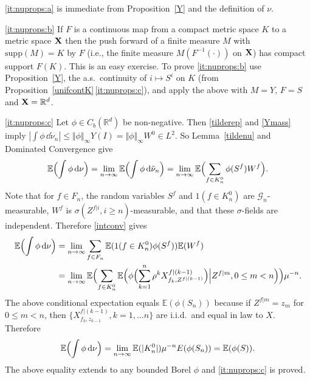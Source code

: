 \documentclass[12pt]{article}
\makeatletter
\renewenvironment{proof}[1][\proofname]{%
\par\pushQED{\qed}\normalfont%
\topsep6\p@\@plus6\p@\relax
\trivlist\item[\hskip\labelsep\bfseries#1\@addpunct{.}]%
\ignorespaces
}{%
\popQED\endtrivlist\@endpefalse
}
\numberwithin{theorem}{section}
\theoremstyle{def}
\numberwithin{equation}{section}
\newcommand{\E}{\mathbb{E}}
\newcommand{\R}{\mathbb{R}}
\newcommand{\cG}{\mathcal G}
\newcommand{\supp}{\mathrm{supp}}
\makeatother
\begin{document}
\begin{proof}
\ref{it:nuprops:a} is immediate from Proposition~\ref{Y} and the definition of $\nu$.

\ref{it:nuprops:b} If $F$ is a continuous map from a compact metric space $K$ to a metric space ${\bf X}$ then the push forward of a finite measure $M$ with $\supp(M)=K$ by $F$ (i.e., the finite measure $M(F^{-1}(\cdot))$ on ${\bf X}$) has compact support $F(K)$.  
This is an easy exercise.  To prove \ref{it:nuprops:b} use Proposition~\ref{Y}, the a.s.\ continuity of $i\mapsto S^i$ on $K$ (from Proposition~\ref{unifcontK}\,\ref{it:nuprops:c}), and apply the above with $M=Y$, $F=S$ and ${\bf X}=\R^d$.  

\ref{it:nuprops:c} Let $\phi\in C_b(\R^d)$ be non-negative.  
Then \eqref{tilderep} and \eqref{Ymass} imply 
$|\int\phi \, \dd \tilde \nu_n|\le \Vert\phi\Vert_\infty Y(I)= \Vert\phi\Vert_\infty W^0\in L^2$. 
So Lemma~\ref{tildenu} and Dominated Convergence give 
\begin{equation}\label{intconv}
\E\Bigl(\int\phi\,\dd \nu\Bigr)=\lim_{n\to\infty} \E\Bigl(\int\phi\,\dd \tilde  \nu_n\Bigr)=\lim_{n\to\infty} \E\Bigl(\sum_{f\in K^0_n}\phi(S^f)W^f\Bigr).
\end{equation}
Note that for $f\in F_n$, the random variables $S^f$ and $1(f\in K^0_n)$ are $\cG_n$-measurable, $W^f$ is $\sigma(Z^{f|i},i\ge n)$-measurable, and that these $\sigma$-fields are independent. Therefore
\eqref{intconv} gives
\begin{align*}
\E\Bigl(\int\phi\,\dd \nu\Bigr)&=\lim_{n\to\infty}\sum_{f\in F_n}\E(1(f\in K^0_n)\phi(S^f))\E(W^f)\\
&=\lim_{n\to\infty}\E\Bigl(\sum_{f\in K^0_n}\E\Bigl(\phi\Bigl(\sum_{k=1}^n \rho^k X^{f|(k-1)}_{f_k,Z^{f|(k-1)}}\Bigr)\Bigl|Z^{f|m},0\le m<n\Bigr)\Bigr)\mu^{-n}.
\end{align*}
The above conditional expectation equals $\E(\phi(S_n))$ because if $Z^{f|m}=z_m$ for $0\le m<n$, then $\{X^{f|(k-1)}_{f_k,z_{k-1}},k=1,\dots n\}$ are i.i.d.\ and equal in law to $X$.  Therefore
\[\E\Bigl(\int\phi\,\dd \nu\Bigr)=\lim_{n\to\infty}\E(|K^0_n|)\mu^{-n}E(\phi(S_n))=\E(\phi(S)).\]
The above equality extends to any bounded Borel $\phi$ and \ref{it:nuprops:c} is proved. 


\end{proof}
\end{document}
